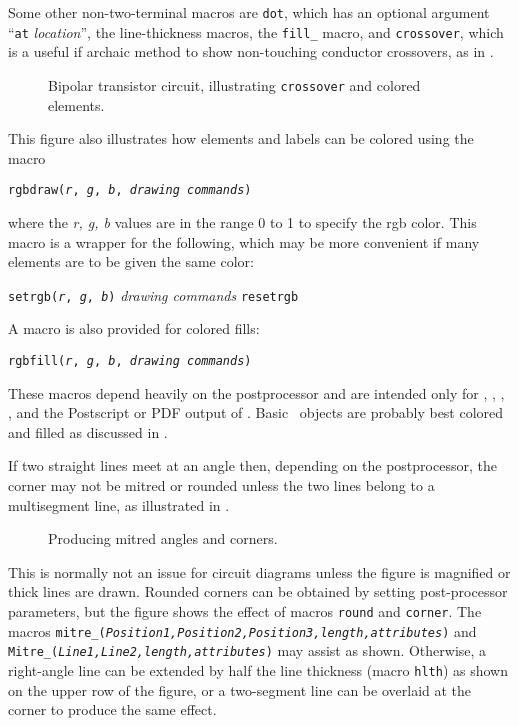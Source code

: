\pagebreak
Some other non-two-terminal macros are {\tt dot}, which has an
optional argument ``{\tt at} {\sl location}'', the line-thickness
macros, the {\tt fill\_} macro, and {\tt crossover}, which is a useful if
archaic method to show non-touching conductor crossovers, as in
.
\begin{figure}[H]
   
   \caption{Bipolar transistor circuit, illustrating {\tt crossover}
      and colored elements.}
   \label{bistable}
   \end{figure}

This figure also illustrates how elements and labels can be colored
using the macro
\par
{\tt rgbdraw({\sl r}, {\sl g}, {\sl b}, {\sl drawing commands})}
\par
\noindent
where the {\sl r, g, b} values are in the range 0 to 1
to specify the rgb color.
This macro is a wrapper for the following, which may be more convenient
if many elements are to be given the same color:

   {\tt setrgb({\sl r}, {\sl g}, {\sl b})}
      \hfill\break\hspace*{\parindent}%
   {\sl drawing commands}
      \hfill\break\hspace*{\parindent}%
   {\tt resetrgb}

A macro is also provided for colored fills:

{\tt rgbfill({\sl r}, {\sl g}, {\sl b}, {\sl drawing commands})}

\noindent%
These macros depend heavily on the postprocessor and are intended only for 
\PSTricks, \TPGF, \MetaPost, \SVG, and the Postscript or PDF output of \dpic.
Basic \Pic\ objects are probably best colored and filled as discussed
in .

%
If two straight lines meet at an angle then, depending on the postprocessor,
the corner may not be mitred or rounded unless the two lines belong to
a multisegment line, as illustrated in .
\begin{figure}[H]
   
   \caption{Producing mitred angles and corners.}
   \label{Corners}
   \end{figure}
This is normally
not an issue for circuit diagrams unless the figure is magnified or thick
lines are drawn.  Rounded corners can be obtained by setting post-processor
parameters, but the figure shows the effect of
macros {\tt round} and {\tt corner}.
The macros
{\tt mitre\_({\sl Position1,Position2,Position3,length,attributes})}
and
{\tt Mitre\_({\sl Line1,Line2,length,attributes})}
may assist as shown.
Otherwise, a right-angle line can be extended
by half the line thickness (macro {\tt hlth}) as shown on the upper row
of the figure,
or a two-segment line can be overlaid at the corner to produce the same effect.

